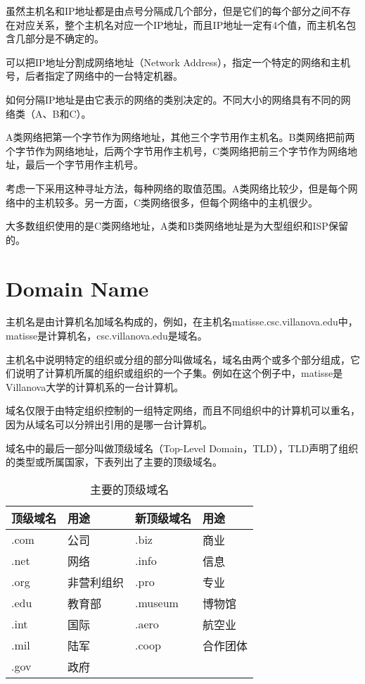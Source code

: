 虽然主机名和IP地址都是由点号分隔成几个部分，但是它们的每个部分之间不存在对应关系，整个主机名对应一个IP地址，而且IP地址一定有4个值，而主机名包含几部分是不确定的。

可以把IP地址分割成网络地址（Network Address），指定一个特定的网络和主机号，后者指定了网络中的一台特定机器。


如何分隔IP地址是由它表示的网络的类别决定的。不同大小的网络具有不同的网络类（A、B和C）。


A类网络把第一个字节作为网络地址，其他三个字节用作主机名。B类网络把前两个字节作为网络地址，后两个字节用作主机号，C类网络把前三个字节作为网络地址，最后一个字节用作主机号。

考虑一下采用这种寻址方法，每种网络的取值范围。A类网络比较少，但是每个网络中的主机较多。另一方面，C类网络很多，但每个网络中的主机很少。

大多数组织使用的是C类网络地址，A类和B类网络地址是为大型组织和ISP保留的。


\section{Domain Name}

主机名是由计算机名加域名构成的，例如，在主机名matisse.csc.villanova.edu中，matisse是计算机名，csc.villanova.edu是域名。

主机名中说明特定的组织或分组的部分叫做域名，域名由两个或多个部分组成，它们说明了计算机所属的组织或组织的一个子集。例如在这个例子中，matisse是Villanova大学的计算机系的一台计算机。

域名仅限于由特定组织控制的一组特定网络，而且不同组织中的计算机可以重名，因为从域名可以分辨出引用的是哪一台计算机。





域名中的最后一部分叫做顶级域名（Top-Level Domain，TLD），TLD声明了组织的类型或所属国家，下表列出了主要的顶级域名。

\begin{table}
\centering
\caption{主要的顶级域名}
\label{top_level_domain}
\begin{tabular}{|p{60pt}|p{60pt}|p{60pt}|p{60pt}|}
\hline
顶级域名		&用途		&	新顶级域名	& 用途\\
\hline
.com			&公司		& .biz			&商业\\
\hline
.net			&网络		&.info			&信息\\
\hline
.org			&非营利组织	&.pro			&专业\\
\hline
.edu			&教育部 		&.museum 		&博物馆\\
\hline
.int			&国际 		&.aero 			&航空业\\
\hline
.mil			&陆军 		&.coop			&合作团体\\
\hline
.gov			&政府 		&				&\\
\hline

\end{tabular}
\end{table}

